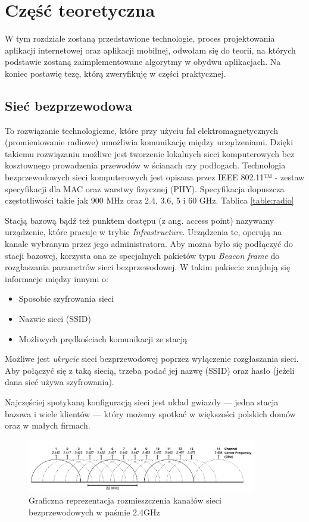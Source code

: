 \chapter{Część teoretyczna}

W tym rozdziale zostaną przedstawione technologie, proces projektowania aplikacji internetowej oraz aplikacji mobilnej, odwołam się do teorii, na których podstawie zostaną zaimplementowane algorytmy w obydwu aplikacjach. Na koniec postawię tezę, którą zweryfikuję w części praktycznej.

\section{Sieć bezprzewodowa}
To rozwiązanie technologiczne, które przy użyciu fal elektromagnetycznych (promieniowanie radiowe) umożliwia komunikację między urządzeniami. Dzięki takiemu rozwiązaniu możliwe jest tworzenie lokalnych sieci komputerowych bez kosztownego prowadzenia przewodów w ścianach czy podłogach. Technologia bezprzewodowych sieci komputerowych jest opisana przez IEEE 802.11™ - zestaw specyfikacji dla MAC oraz warstwy fizycznej (PHY). Specyfikacja dopuszcza częstotliwości takie jak 900 MHz oraz 2.4, 3.6, 5 i 60 GHz. Tablica \ref{table:radio}

Stacją bazową bądź też punktem dostępu (z ang. access point) nazywamy urządzenie, które pracuje w trybie \textit{Infrastructure}. Urządzenia te, operują na kanale wybranym przez jego administratora. Aby można było się podłączyć do stacji bazowej, korzysta ona ze specjalnych pakietów typu \textit{Beacon frame} do rozgłaszania parametrów sieci bezprzewodowej. W takim pakiecie znajdują się informacje między innymi o:
\begin{itemize}
    \item Sposobie szyfrowania sieci
    \item Nazwie sieci (SSID)
    \item Możliwych prędkościach komunikacji ze stacją
\end{itemize}

Możliwe jest \textit{ukrycie} sieci bezprzewodowej poprzez wyłączenie rozgłaszania sieci. Aby połączyć się z taką siecią, trzeba podać jej nazwę (SSID) oraz hasło (jeżeli dana sieć używa szyfrowania).

Najczęściej spotykaną konfiguracją sieci jest układ gwiazdy — jedna stacja bazowa i wiele klientów — który możemy spotkać w większości polskich domów oraz w małych firmach.

\begin{figure}[h!]
  \centering
    \includegraphics[width=10cm]{images/wifi_channels}
  \caption{Graficzna reprezentacja rozmieszczenia kanałów sieci bezprzewodowych w paśmie 2.4GHz}
  \label{fig:wifiChannels}
\end{figure}

